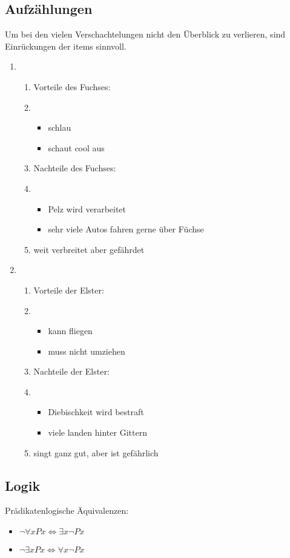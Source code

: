 \subsection{Aufzählungen}
Um bei den vielen Verschachtelungen nicht den Überblick zu verlieren, sind Einrückungen der items sinnvoll.
\begin{enumerate}
  \item 
  \begin{enumerate}
    \item Vorteile des Fuchses:
    \item
    \begin{itemize}
      \item schlau
      \item schaut cool aus
    \end{itemize}
    \item Nachteile des Fuchses:
    \item
    \begin{itemize}
      \item Pelz wird verarbeitet
      \item sehr viele Autos fahren gerne über Füchse
    \end{itemize}
    \item weit verbreitet aber gefährdet
  \end{enumerate}
  \item
  \begin{enumerate}
    \item Vorteile der Elster:
    \item
    \begin{itemize}
      \item kann fliegen
      \item muss nicht umziehen
    \end{itemize}
    \item Nachteile der Elster:
    \item
    \begin{itemize}
      \item Diebischkeit wird bestraft
      \item viele landen hinter Gittern
    \end{itemize}
      \item singt ganz gut, aber ist gefährlich
  \end{enumerate}
\end{enumerate}

\subsection{Logik}
Prädikatenlogische Äquivalenzen:
\begin{itemize}
	\item $\lnot\forall xPx \Leftrightarrow \exists x\lnot Px$
	\item $\lnot\exists xPx \Leftrightarrow \forall x \lnot Px$
\end{itemize}

